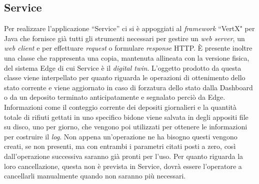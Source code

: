 \documentclass[a4paper, 12pt]{report}
\begin{document}
			\subsection{Service}
			Per realizzare l'applicazione ``Service'' ci si è appoggiati al \textit{framework} ``VertX" per Java
			che fornisce già tutti gli strumenti necessari per gestire un \textit{web server}, un
			\textit{web client} e per effettuare \textit{request} o formulare \textit{response} HTTP.
			È presente inoltre una classe che rappresenta una copia, mantenuta allineata con la versione fisica, del sistema
			Edge di cui Service è il \textit{digital twin}. L'oggetto prodotto da questa classe viene
			interpellato per quanto riguarda le operazioni di ottenimento dello stato corrente e viene
			aggiornato in caso di forzatura dello stato dalla Dashboard o da un deposito terminato
			anticipatamente e segnalato perciò da Edge. Informazioni come il conteggio corrente dei
			depositi giornalieri e la quantità totale di rifiuti gettati in uno specifico bidone
			viene salvata in degli appositi file su disco, uno per giorno, che vengono poi utilizzati
			per ottenere le informazioni per costruire il \textit{log}. Non appena un'operazione ne ha
			bisogno questi vengono creati, se non presenti, ma con entrambi i parametri citati
			posti a zero, così dall'operazione successiva saranno già pronti per l'uso. Per quanto
			riguarda la loro cancellazione, questa non è prevista in Service, dovrà essere l'operatore
			a cancellarli manualmente quando non saranno più necessari.
\end{document}
